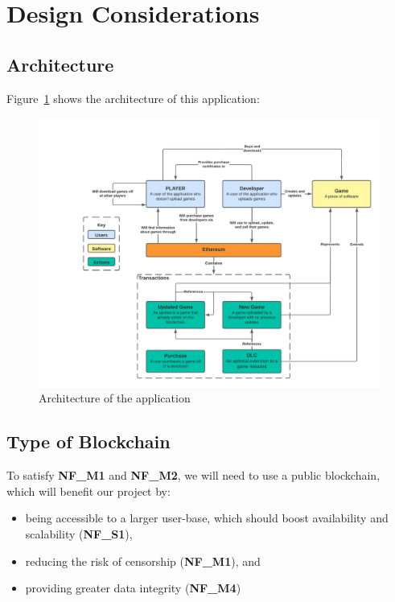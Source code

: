 \newpage
\section{Design Considerations}

\subsection*{Architecture}

Figure~\ref{fig:architecture-diagram} shows the architecture of this application:

\begin{figure}[ht]
  \centering
  \includegraphics*[width=\textwidth]{assets/images/diagrams/architecture-diagram.png}
  \caption{Architecture of the application}
  \label{fig:architecture-diagram}
\end{figure}

\subsection*{Type of Blockchain}

To satisfy \textbf{NF\_M1} and \textbf{NF\_M2}, we will need to use a public blockchain, which will benefit our project by:

\begin{itemize}
  \item being accessible to a larger user-base, which should boost availability and scalability (\textbf{NF\_S1}),
  \item reducing the risk of censorship (\textbf{NF\_M1}), and
  \item providing greater data integrity (\textbf{NF\_M4})
\end{itemize}

